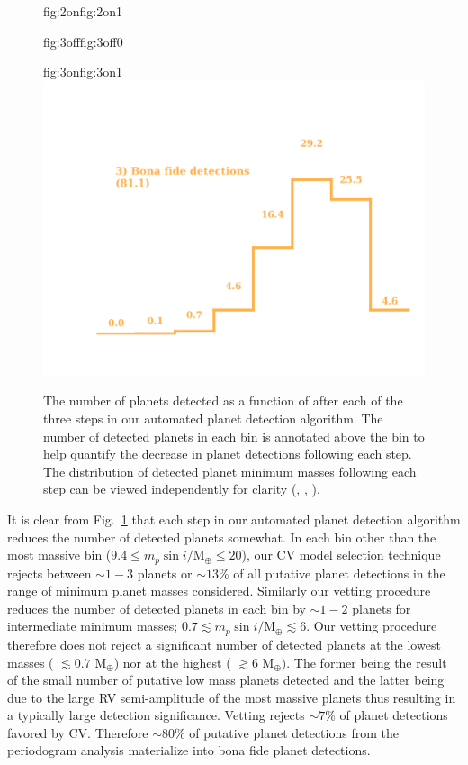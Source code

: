 \begin{figure}
\begin{ocg}{fig:2on}{fig:2on}{1}
  \end{ocg}
  \hspace{-0.6\hsize}%
  \begin{ocg}{fig:3off}{fig:3off}{0}%
  \end{ocg}%
  \begin{ocg}{fig:3on}{fig:3on}{1}%
    \includegraphics[width=0.6\hsize]{figures/detectedpopulations_3.png}%
  \end{ocg}
  \hspace{-0.6\hsize}%
  \caption[SPIRou planet yields versus \msini{} throughout the vetting process.]
      {\small The number of planets detected as a function of \msini{} after each of the three steps in
    our automated planet detection algorithm. The number of detected planets in each
    \msini{} bin is annotated above the bin to help quantify the decrease in planet detections
    following each step. The distribution of detected planet minimum masses
    following each step can be viewed independently for clarity
    (,
    ,
    ).}
    \label{BSfig:detections}
\end{figure}

It is clear from Fig.~\ref{BSfig:detections} that each step in our automated planet detection algorithm
reduces the number of detected planets somewhat.
In each \msini{} bin other than the most massive bin ($9.4 \leq m_p\sin{i}/\text{M}_{\oplus} \leq 20$),
our CV model selection technique rejects between $\sim 1-3$ planets or
$\sim 13$\% of all putative planet detections in the range of minimum planet masses considered. Similarly
our vetting procedure reduces the number of detected planets in each \msini{} bin by $\sim 1-2$ planets
for intermediate minimum masses; $0.7 \lesssim m_p\sin{i}/\text{M}_{\oplus} \lesssim 6$.
Our vetting procedure therefore does not reject a significant number of detected
planets at the lowest masses (\msini{} $\lesssim 0.7$ M$_{\oplus}$) nor at the highest
(\msini{} $\gtrsim 6$ M$_{\oplus}$). The former being the result of the small number of putative low mass planets
detected and the latter being due to the large RV semi-amplitude of the most massive planets thus resulting
in a typically large detection significance. Vetting rejects $\sim 7$\% of planet detections favored by
CV. Therefore $\sim 80$\% of putative planet detections from the periodogram analysis materialize
into bona fide planet detections.


